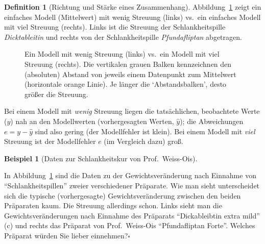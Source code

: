 \documentclass[
  a4paper,
  DIV=11]{scrreprt}
\theoremstyle{definition}
\theoremstyle{definition}
\newtheorem{example}{Beispiel}[chapter]
\theoremstyle{definition}
\newtheorem{definition}{Definition}[chapter]
\theoremstyle{remark}
\begin{document}
\begin{definition}[Richtung und Stärke eines
Zusammenhang]
Abbildung~\ref{fig-streuung} zeigt ein einfaches Modell (Mittelwert) mit
wenig Streuung (links) vs.~ein einfaches Modell mit viel Streuung
(rechts). Links ist die Streuung der Schlankheitspille
\emph{Dicktableitin} und rechts von der Schlankheitspille
\emph{Pfundafliptan} abgetragen.

\begin{figure}


\caption{\label{fig-streuung}Ein Modell mit wenig Streuung (links)
vs.~ein Modell mit viel Streuung (rechts). Die vertikalen grauen Balken
kennzeichnen den (absoluten) Abstand von jeweils einem Datenpunkt zum
Mittelwert (horizontale orange Linie). Je länger die `Abstandsbalken',
desto größer die Streuung.}

\end{figure}%

Bei einem Modell mit \emph{wenig} Streuung liegen die tatsächlichen,
beobachtete Werte (\(y\)) nah an den Modellwerten (vorhergesagten
Werten, \(\hat{y}\)); die Abweichungen \(e = y - \hat{y}\) sind also
gering (der Modellfehler ist klein). Bei einem Modell mit \emph{viel}
Streuung ist der Modellfehler \(e\) (im Vergleich dazu) groß.

\begin{example}[Daten zur Schlankheitskur von
Prof.~Weiss-Ois]\protect\hypertarget{exm-weiss-ois}{}\label{exm-weiss-ois}

In Abbildung~\ref{fig-streuung} sind die Daten zu der
Gewichtsveränderung nach Einnahme von ``Schlankheitspillen'' zweier
verschiedener Präparate. Wie man sieht unterscheidet sich die typische
(vorhergesagte) Gewichtsveränderung zwischen den beiden Präparaten kaum.
Die Streuung allerdings schon. Links sieht man die Gewichtsveränderungen
nach Einnahme des Präparats ``Dickableibtin extra mild'' (c) und rechts
das Präparat von Prof.~Weiss-Ois ``Pfundafliptan Forte''. Welches
Präparat würden Sie lieber einnehmen?\(\square\)


\end{example}
\end{definition}
\end{document}
